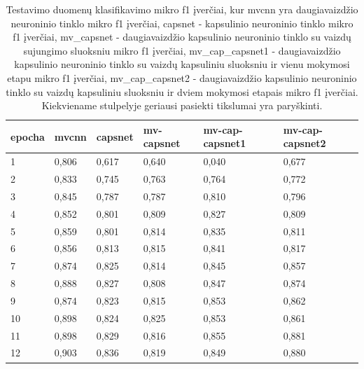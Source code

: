 \begin{table}[]
	\begin{tabular}{l|l|l|l|l|l}
		epocha & mvcnn & capsnet & mv-capsnet & mv-cap-capsnet1 & mv-cap-capsnet2 \\
		\hline
		1 & 0,806 &   0,617 &      0,640 &           0,040 &           0,677 \\
		2 & 0,833 &   0,745 &      0,763 &           0,764 &           0,772 \\
		3 & 0,845 &   0,787 &      0,787 &           0,810 &           0,796 \\
		4 & 0,852 &   0,801 &      0,809 &           0,827 &           0,809 \\
		5 & 0,859 &   0,801 &      0,814 &           0,835 &           0,811 \\
		6 & 0,856 &   0,813 &      0,815 &           0,841 &           0,817 \\
		7 & 0,874 &   0,825 &      0,814 &           0,845 &           0,857 \\
		8 & 0,888 &   0,827 &      0,808 &           0,847 &           0,874 \\
		9 & 0,874 &   0,823 &      0,815 &           0,853 &           0,862 \\
		10 & 0,898 &   0,824 &      0,825 &           0,853 &           0,861 \\
		11 & 0,898 &   0,829 &      0,816 &           0,855 &           0,881 \\
		12 & 0,903 &   0,836 &      0,819 &           0,849 &           0,880 \\
	\end{tabular}
	\caption{
		Testavimo duomenų klasifikavimo mikro f1 įverčiai, kur mvcnn yra daugiavaizdžio neuroninio tinklo mikro f1 įverčiai, capsnet - kapsulinio neuroninio tinklo mikro f1 įverčiai, mv\_capsnet - daugiavaizdžio kapsulinio neuroninio tinklo su vaizdų sujungimo sluoksniu mikro f1 įverčiai, mv\_cap\_capsnet1 - daugiavaizdžio kapsulinio neuroninio tinklo su vaizdų kapsuliniu sluoksniu ir vienu mokymosi etapu mikro f1 įverčiai, mv\_cap\_capsnet2 - daugiavaizdžio kapsulinio neuroninio tinklo su vaizdų kapsuliniu sluoksniu ir dviem mokymosi etapais mikro f1 įverčiai. Kiekviename stulpelyje geriausi pasiekti tikslumai yra paryškinti.
	}
	\label{tbl:micro_f1}
\end{table}


